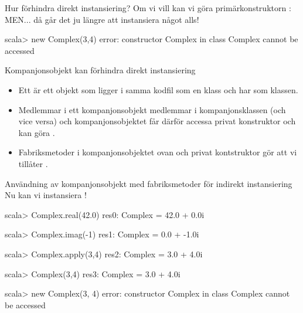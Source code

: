 \begin{Slide}{Hur förhindra direkt instansiering?}
Om vi vill  kan vi göra primärkonstruktorn :
MEN... då går det ju  längre att instansiera något alls!  \code{   :(}
\begin{REPLnonum}
scala> new Complex(3,4)
error:
 constructor Complex in class Complex cannot be accessed
\end{REPLnonum}
\end{Slide}



\begin{Slide}{Kompanjonsobjekt kan förhindra direkt instansiering}\SlideFontSmall
\setlength{\leftmargini}{0pt}
\begin{itemize}
\item Ett  är ett objekt som ligger i samma kodfil som en klass och har  som klassen.

\item Medlemmar i ett kompanjonsobjekt  medlemmar i kompanjonsklassen (och vice versa) och kompanjonsobjektet får därför accessa privat konstruktor och kan göra .

\item Fabriksmetoder i kompanjonsobjektet ovan och privat kontstruktor gör att vi  tillåter .
\end{itemize}
\end{Slide}

\begin{Slide}{Användning av kompanjonsobjekt med fabriksmetoder för indirekt instansiering}
Nu kan vi  instansiera !  \code{   :)}
\begin{REPLnonum}
scala> Complex.real(42.0)
res0: Complex = 42.0 + 0.0i

scala> Complex.imag(-1)
res1: Complex = 0.0 + -1.0i

scala> Complex.apply(3,4)
res2: Complex = 3.0 + 4.0i

scala> Complex(3,4)
res3: Complex = 3.0 + 4.0i

scala> new Complex(3, 4)
error:
     constructor Complex in class Complex cannot be accessed
\end{REPLnonum}
\end{Slide}


